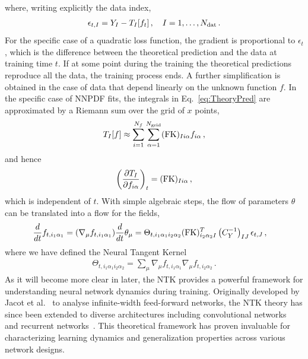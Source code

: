 where, writing explicitly the data index,
\begin{align}
    \label{eq:EpsDef}
    \epsilon_{t,I} = Y_I - T_I[f_t]\, , \quad I=1, \ldots, N_{\mathrm{dat}}\, .
\end{align}
For the specific case of a quadratic loss function, the gradient is proportional
to $\epsilon_t$, which is the difference between the theoretical prediction and
the data at training time $t$. If at some point during the training the
theoretical predictions reproduce all the data, the training process ends. A
further simplification is obtained in the case of data that depend linearly on
the unknown function $f$. In the specific case of NNPDF fits, the integrals in
Eq.~\eqref{eq:TheoryPred} are approximated by a Riemann sum over the grid of $x$
points,
\begin{align}
    \label{eq:FKTabDef}
    T_I[f] \approx \sum_{i=1}^{N_{f}}\sum_{\alpha=1}^{N_{\mathrm{grid}}} (\mathrm{FK})_{Ii\alpha} f_{i\alpha}\, ,
\end{align}
and hence
\begin{align}
    \label{eq:dTbydf}
    \left(\frac{\partial T_I}{\partial f_{i\alpha}}\right)_t =
        (\mathrm{FK})_{Ii\alpha}\, ,
\end{align}
which is independent of $t$. With simple algebraic steps, the flow of parameters
$\theta$ can be translated into a flow for the fields,
\begin{align}
    \label{eq:NTKFlow}
    \frac{d}{dt} &f_{t,i_1\alpha_1} = (\nabla_\mu f_{t,i_1\alpha_1}) \frac{d}{dt} \theta_\mu =
      \Theta_{t,i_1\alpha_1i_2\alpha_2}
      (\mathrm{FK})^T_{i_2\alpha_2I} \left(C_Y^{-1}\right)_{IJ} \epsilon_{t,J}\, ,
\end{align}
where we have defined the Neural Tangent Kernel~\cite{jacot2018neural}
\begin{align}
    \label{eq:NTKDef}
    \Theta_{t,i_1\alpha_1i_2\alpha_2} = \sum_\mu
    \nabla_\mu f_{t,i_1\alpha_1} \nabla_\mu f_{t,i_2\alpha_2}\, .
\end{align}
As it will become more clear in later, the NTK provides a powerful framework for
understanding neural network dynamics during training. Originally developed by
Jacot et al.~\cite{jacot2018neural} to analyse infinite-width feed-forward
networks, the NTK theory has since been extended to diverse architectures
including convolutional networks~\cite{arora2019exact} and recurrent
networks~\cite{alemohammad2021recurrent}. This theoretical framework has proven
invaluable for characterizing learning dynamics and generalization properties
across various network designs. 

